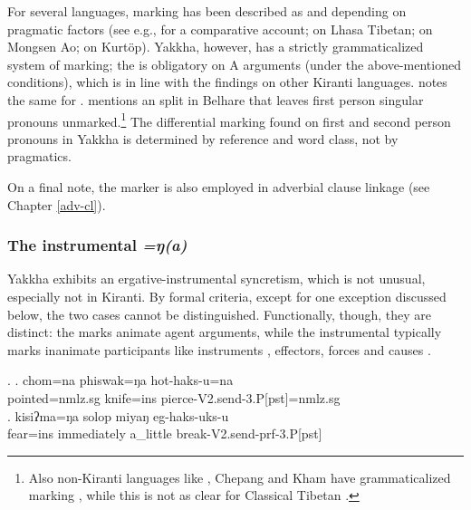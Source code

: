 	
For several  languages,  marking has been described as  and depending on pragmatic factors  (see e.g., \citet{LaPolla1995_Ergative} for a comparative account; \citet{Tournadre1991_Rhetorical} on Lhasa Tibetan; \citet{Coupe2007_Mongsen} on Mongsen Ao; \citet{Hyslop2011_Kurtop} on Kurtöp). Yakkha, however, has a strictly grammaticalized system of  marking; the  is obligatory on A arguments (under the above-mentioned conditions), which is in line with the findings on other Kiranti languages. \citet[74]{Doornenbal2009A-grammar} notes  the same for .  \citet[549]{Bickel2003Belhare} mentions an  split in Belhare that leaves first person singular pronouns unmarked.\footnote{Also non-Kiranti languages like , Chepang and Kham have  grammaticalized  marking \citep{LaPolla1995_Ergative}, while this is not as clear for Classical Tibetan \citep{DeLancey2011_Optional}.} The differential marking found on first and second person pronouns in Yakkha is determined by reference and word class, not by pragmatics. 

On a final note, the  marker is also employed in adverbial clause linkage (see Chapter \ref{adv-cl}).


\subsubsection{The instrumental \emph{=ŋ(a)}}\label{case-ins}
Yakkha exhibits an ergative-instrumental syncretism, which is not unusual, especially not in Kiranti. By formal criteria, except for one exception discussed below, the two cases cannot be distinguished.  Functionally, though, they are distinct: the  marks animate agent arguments, while the instrumental  typically marks inanimate participants like  instruments \Next[a], effectors, forces and causes \Next[b]. 

	\ex. \ag. chom=na phiswak=ŋa hot-haks-u=na\\
	pointed{\sc =nmlz.sg} knife{\sc =ins} pierce-{\sc V2.send-3.P[pst]=nmlz.sg}\\
	\bg. kisiʔma=ŋa solop miyaŋ eg-haks-uks-u\\
		fear{\sc =ins} immediately a\_little  break{\sc-V2.send-prf-3.P[pst] }\\
		 
		
